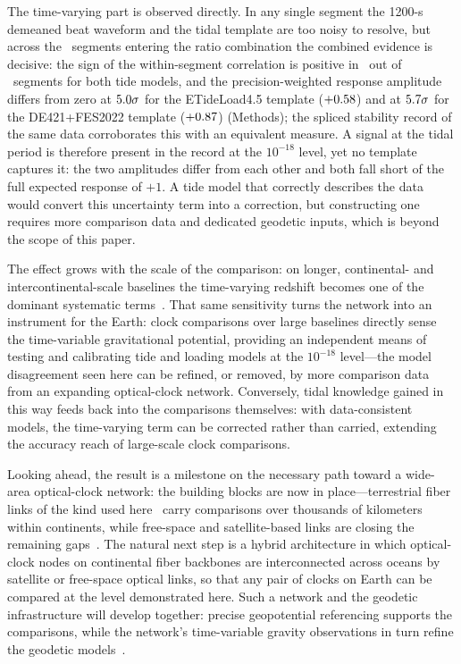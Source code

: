 The time-varying part is observed directly. In any single segment
the 1200-s demeaned beat waveform and the tidal template are too
noisy to resolve, but across the \nSeg~segments entering the ratio
combination the combined evidence is decisive: the sign of the
within-segment correlation is positive in \tidalNegSeg~out of
\nSeg~segments for both tide models, and the precision-weighted
response amplitude differs from zero at $5.0\sigma$ for
the ETideLoad4.5 template ($+0.58$) and at
$5.7\sigma$ for the DE421+FES2022 template
($+0.87$) (Methods); the spliced stability record of the
same data corroborates this with an equivalent measure. A signal at
the tidal period is therefore
present in the record at the $10^{-18}$ level, yet no template
captures it: the two amplitudes differ from each other and both fall
short of the full expected response of $+1$. A tide model that
correctly describes the data would convert this uncertainty term into
a correction, but constructing one requires more comparison data and
dedicated geodetic inputs, which is beyond the scope of this paper.

The effect grows with the scale of the comparison: on
longer, continental- and intercontinental-scale baselines the
time-varying redshift becomes one of the dominant systematic
terms~\citep{denker2018geodetic}. That same sensitivity turns the
network into an instrument for the Earth: clock comparisons over
large baselines directly sense the time-variable gravitational
potential, providing an independent means of testing and calibrating
tide and loading models at the $10^{-18}$ level---the model
disagreement seen here can be refined, or removed, by more comparison
data from an expanding optical-clock network. Conversely, tidal
knowledge gained in this way feeds back into the comparisons
themselves: with data-consistent models, the time-varying term can be
corrected rather than carried, extending the accuracy reach of
large-scale clock comparisons.

Looking ahead, the result is a milestone on the necessary path
toward a wide-area optical-clock network: the building blocks are now
in place---terrestrial fiber links of the
kind used here~\citep{schioppo2022cavities, chen2026dissemination}
carry comparisons over thousands of kilometers within continents,
while free-space and satellite-based links are closing the remaining
gaps~\citep{pizzocaro2021vlbi, shen2021satellite,
shen2022freespace, caldwell2023geo}. The natural next step is a
hybrid architecture in which optical-clock nodes on continental fiber
backbones are interconnected across oceans by satellite or free-space
optical links, so that any pair of clocks on Earth can be compared at
the level demonstrated here. Such a network and the geodetic
infrastructure will develop together: precise geopotential
referencing supports the comparisons, while the network's
time-variable gravity observations in turn refine the geodetic
models~\citep{grotti2018geodesy, mcgrew2018geodesy}.
